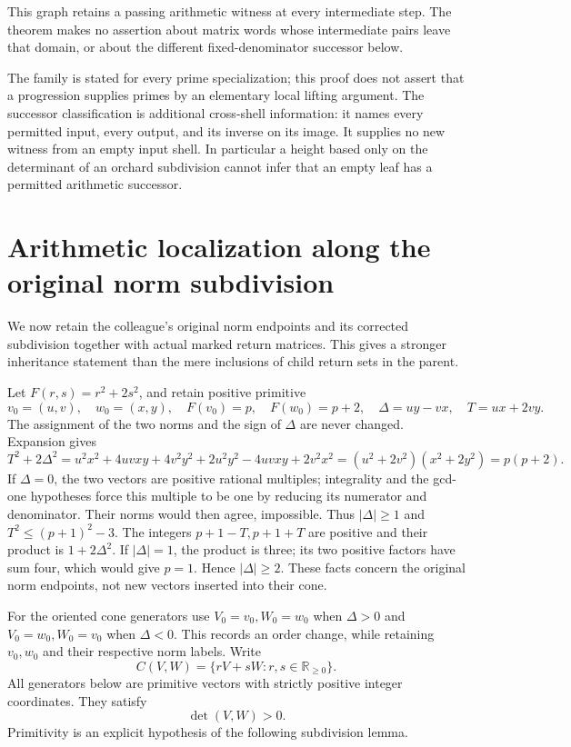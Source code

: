 \documentclass[11pt]{article}
\theoremstyle{definition}\newtheorem{definition}[theorem]{Definition}
\theoremstyle{remark}\newtheorem{remark}[theorem]{Remark}
\begin{document}
This graph retains a passing arithmetic witness at every
intermediate step.  The theorem makes no assertion about
matrix words whose intermediate pairs leave that domain,
or about the different fixed-denominator successor below.

The family is stated for every prime specialization; this proof
does not assert that a progression supplies primes by an elementary
local lifting argument.  The successor classification is additional
cross-shell information: it names every permitted input, every
output, and its inverse on its image.  It supplies no new witness
from an empty input shell.  In particular a height based only on
the determinant of an orchard subdivision cannot infer that an
empty leaf has a permitted arithmetic successor.

\section{Arithmetic localization along the original norm subdivision}

We now retain the colleague's original norm endpoints and its corrected
subdivision together with actual marked return matrices.  This gives a
stronger inheritance statement than the mere inclusions of child
return sets in the parent.

Let \(F(r,s)=r^2+2s^2\), and retain positive primitive
\[
 v_0=(u,v),\quad w_0=(x,y),\quad
 F(v_0)=p,\quad F(w_0)=p+2,\quad
 \Delta=uy-vx,\quad T=ux+2vy .
\]
The assignment of the two norms and the sign of \(\Delta\) are never
changed.  Expansion gives
\[
 T^2+2\Delta^2
 =u^2x^2+4uvxy+4v^2y^2
   +2u^2y^2-4uvxy+2v^2x^2
 =(u^2+2v^2)(x^2+2y^2)=p(p+2).
\]
If \(\Delta=0\), the two vectors are positive rational multiples;
integrality and the gcd-one hypotheses force this multiple to be
one by reducing its numerator and denominator.  Their norms would
then agree, impossible.  Thus \(|\Delta|\ge1\) and
\(T^2\le(p+1)^2-3\).  The integers \(p+1-T,p+1+T\)
are positive and their product is \(1+2\Delta^2\).
If \(|\Delta|=1\), the product is three; its two positive factors
have sum four, which would give \(p=1\).  Hence
\(|\Delta|\ge2\).  These facts concern the original norm
endpoints, not new vectors inserted into their cone.

For the oriented cone generators use \(V_0=v_0,W_0=w_0\)
when \(\Delta>0\) and \(V_0=w_0,W_0=v_0\) when \(\Delta<0\).
This records an order change, while retaining \(v_0,w_0\) and
their respective norm labels.  Write
\[
 C(V,W)=\{rV+sW:r,s\in\mathbb R_{\ge0}\}.
\]
All generators below are primitive vectors with strictly positive
integer coordinates.  They satisfy
\[
 \det(V,W)>0 .
\]
Primitivity is an explicit hypothesis of the following subdivision lemma.
\end{document}
